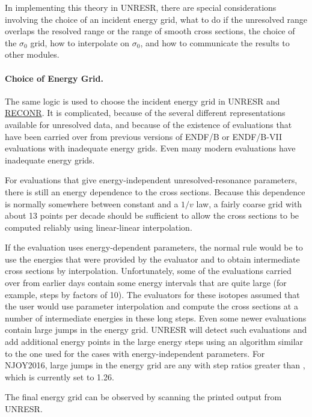 In implementing this theory in UNRESR, there are special considerations
involving the choice of an incident energy grid, what to do if the
unresolved range overlaps the resolved range or the range of smooth
cross sections, the choice of the $\sigma_0$ grid, how to interpolate
on $\sigma_0$, and how to communicate the results to other modules.

\paragraph{Choice of Energy Grid.}
The same logic is used to choose the incident energy grid in UNRESR
and \hyperlink{sRECONRhy}{RECONR}.  It is complicated, because
of the several different
representations available for unresolved data, and because of the
existence of evaluations that have been carried over from previous
versions of ENDF/B or ENDF/B-VII evaluations with inadequate
energy grids.  Even many modern evaluations have inadequate energy
grids.

For evaluations that give energy-independent unresolved-resonance
parameters, there is still an energy dependence to the cross sections.
Because this dependence is normally somewhere between constant and
a $1/v$ law, a fairly coarse grid with about 13 points per decade
should be sufficient to allow the cross sections to be computed
reliably using linear-linear interpolation.

If the evaluation uses energy-dependent parameters, the normal rule
would be to use the energies that were provided by the evaluator
and to obtain intermediate cross sections by interpolation.  Unfortunately,
some of the evaluations carried over from earlier days contain some
energy intervals that are quite large (for example, steps by factors
of 10).  The evaluators for these isotopes assumed that the user
would use parameter interpolation and compute the cross sections
at a number of intermediate energies in these long steps.  Even
some newer evaluations contain large jumps in the energy grid.  UNRESR
will detect such evaluations and add additional energy points in the
large energy steps using an algorithm similar to the one used for
the cases with energy-independent parameters.  For NJOY2016,
large jumps in the energy grid are any with step ratios greater
than , which is currently set
to 1.26.

The final energy grid can be observed by scanning the printed
output from UNRESR.


